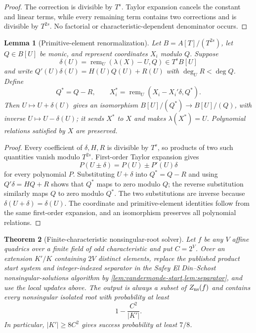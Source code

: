 \documentclass[10pt,a4paper]{article}
\newtheorem{theorem}{Theorem}[section]
\newtheorem{lemma}[theorem]{Lemma}
\begin{document}
\begin{proof}
The correction is divisible by $T^s$.  Taylor expansion cancels the constant and linear terms, while every remaining term contains two corrections and is divisible by $T^{2s}$.  No factorial or characteristic-dependent denominator occurs.
\end{proof}

\begin{lemma}[Primitive-element renormalization]\label{lem:primitive-renorm}
Let $B=A[T]/(T^{2s})$, let $Q\in B[U]$ be monic, and represent coordinates $X_i$ modulo $Q$.  Suppose
\[
\delta(U)=\operatorname{rem}_U(\lambda(X)-U,Q)\in T^sB[U]
\]
and write $Q'(U)\delta(U)=H(U)Q(U)+R(U)$ with $\deg_U R<\deg Q$.  Define
\[
Q^*=Q-R,
\qquad
X_i^*=\operatorname{rem}_U(X_i-X_i'\delta,Q^*).
\]
Then $U\mapsto U+\delta(U)$ gives an isomorphism $B[U]/(Q^*)\to B[U]/(Q)$, with inverse $U\mapsto U-\delta(U)$; it sends $X^*$ to $X$ and makes $\lambda(X^*)=U$.  Polynomial relations satisfied by $X$ are preserved.
\end{lemma}

\begin{proof}
Every coefficient of $\delta,H,R$ is divisible by $T^s$, so products of two such quantities vanish modulo $T^{2s}$.  First-order Taylor expansion gives
\[
P(U\pm\delta)=P(U)\pm P'(U)\delta
\]
for every polynomial $P$.  Substituting $U+\delta$ into $Q^*=Q-R$ and using $Q'\delta=HQ+R$ shows that $Q^*$ maps to zero modulo $Q$; the reverse substitution similarly maps $Q$ to zero modulo $Q^*$.  The two substitutions are inverse because $\delta(U+\delta)=\delta(U)$.  The coordinate and primitive-element identities follow from the same first-order expansion, and an isomorphism preserves all polynomial relations.
\end{proof}

\begin{theorem}[Finite-characteristic nonsingular-root solver]\label{thm:fallback-solver}
Let $f$ be any $V$ affine quadrics over a finite field of odd characteristic and put $C=2^V$.  Over an extension $K'/K$ containing $2V$ distinct elements, replace the published product start system and integer-indexed separator in the Safey El Din--Schost nonsingular-solutions algorithm by \cref{lem:vandermonde-start,lem:separator}, and use the local updates above.  The output is always a subset of $Z_{\rm ns}(f)$ and contains every nonsingular isolated root with probability at least
\[
1-\frac{C^2}{|K'|}.
\]
In particular, $|K'|\ge8C^2$ gives success probability at least $7/8$.
\end{theorem}
\end{document}
